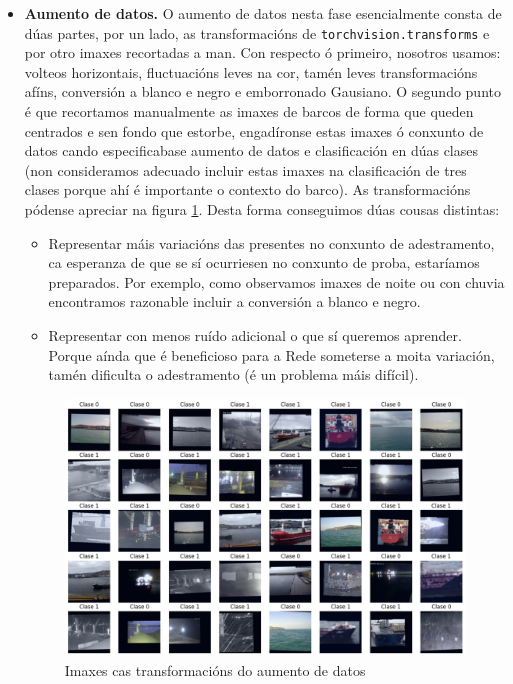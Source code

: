 \documentclass{article}
\begin{document}
\begin{itemize}
	\item \textbf{Aumento de datos.} O aumento de datos nesta fase esencialmente consta de dúas partes, por un lado, as transformacións de \texttt{torchvision.transforms} e por otro imaxes recortadas a man. Con respecto ó  primeiro, nosotros usamos: volteos horizontais, fluctuacións leves na cor, tamén leves transformacións afíns, conversión a blanco e negro e emborronado Gausiano. O segundo punto é que recortamos manualmente as imaxes de barcos de forma que queden centrados e sen fondo que estorbe, engadíronse estas imaxes ó conxunto de datos cando especificabase aumento de datos e clasificación en dúas clases (non consideramos adecuado incluir estas imaxes na clasificación de tres clases porque ahí é importante o contexto do barco). As transformacións pódense apreciar na figura \ref{fig:aumento}. Desta forma conseguimos dúas cousas distintas: 
	\begin{itemize}
		\item Representar máis variacións das presentes no conxunto de adestramento, ca esperanza de que se sí ocurriesen no conxunto de proba, estaríamos preparados. Por exemplo, como observamos imaxes de noite ou con chuvia encontramos razonable incluir a conversión a blanco e negro.
		\item Representar con menos ruído adicional o que sí queremos aprender. Porque aínda que é beneficioso para a Rede someterse a moita variación, tamén dificulta o adestramento (é un problema máis difícil).
\end{itemize}

\begin{figure}[h]
	\centering
	\includegraphics[width=0.9\linewidth]{aumentoDatosEx1.png}
	\caption{Imaxes cas transformacións do aumento de datos}
	\label{fig:aumento}
\end{figure}


\end{itemize}
\end{document}
